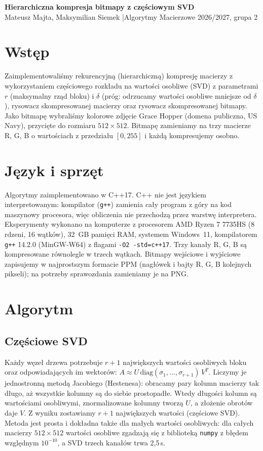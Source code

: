 \documentclass[11pt,a4paper]{article}
\begin{document}
\begin{center}
{\Large\bfseries\sffamily Hierarchiczna kompresja bitmapy z częściowym SVD}\\[0.6em]
Mateusz Majta, Maksymilian Siemek \quad|\quad Algorytmy Macierzowe 2026/2027, grupa 2
\end{center}

\section{Wstęp}
Zaimplementowaliśmy rekurencyjną (hierarchiczną) kompresję macierzy z wykorzystaniem częściowego rozkładu na
wartości osobliwe (SVD) z parametrami $r$ (maksymalny rząd bloku) i $\delta$ (próg: odrzucamy wartości osobliwe
mniejsze od $\delta$), rysowacz skompresowanej macierzy oraz rysowacz skompresowanej bitmapy. Jako bitmapę wybraliśmy
kolorowe zdjęcie Grace Hopper (domena publiczna, US Navy), przycięte do rozmiaru $512\times512$. Bitmapę zamieniamy
na trzy macierze R, G, B o wartościach z przedziału $[0,255]$ i każdą kompresujemy osobno.

\section{Język i sprzęt}
Algorytmy zaimplementowano w C++17. C++ nie jest językiem interpretowanym: kompilator (\texttt{g++}) zamienia cały
program z góry na kod maszynowy procesora, więc obliczenia nie przechodzą przez warstwę interpretera. Eksperymenty
wykonano na komputerze z procesorem AMD Ryzen 7 7735HS (8 rdzeni, 16 wątków), 32~GB pamięci RAM, systemem Windows~11,
kompilatorem \texttt{g++} 14.2.0 (MinGW-W64) z flagami \texttt{-O2 -std=c++17}. Trzy kanały R, G, B są kompresowane
równolegle w trzech wątkach. Bitmapy wejściowe i wyjściowe zapisujemy w najprostszym formacie PPM (nagłówek i bajty
R, G, B kolejnych pikseli); na potrzeby sprawozdania zamieniamy je na PNG.

\section{Algorytm}
\subsection{Częściowe SVD}
Każdy węzeł drzewa potrzebuje $r+1$ największych wartości osobliwych bloku oraz odpowiadających im wektorów:
$A\approx U\,\mathrm{diag}(\sigma_1,\dots,\sigma_{r+1})\,V^T$. Liczymy je jednostronną metodą Jacobiego (Hestenesa):
obracamy pary kolumn macierzy tak długo, aż wszystkie kolumny są do siebie prostopadłe. Wtedy długości kolumn są
wartościami osobliwymi, znormalizowane kolumny tworzą $U$, a złożenie obrotów daje $V$. Z wyniku zostawiamy $r+1$
największych wartości (częściowe SVD). Metoda jest prosta i dokładna także dla małych wartości osobliwych: dla
całych macierzy $512\times512$ wartości osobliwe zgadzają się z biblioteką \texttt{numpy} z błędem względnym
$10^{-10}$, a SVD trzech kanałów trwa 2{,}5\,s.
\end{document}
